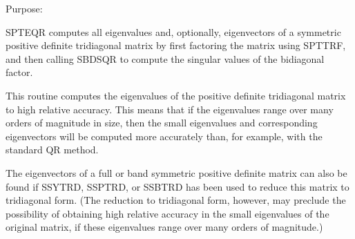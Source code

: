  \begin{DoxyParagraph}{Purpose\+: }
\begin{DoxyVerb} SPTEQR computes all eigenvalues and, optionally, eigenvectors of a
 symmetric positive definite tridiagonal matrix by first factoring the
 matrix using SPTTRF, and then calling SBDSQR to compute the singular
 values of the bidiagonal factor.

 This routine computes the eigenvalues of the positive definite
 tridiagonal matrix to high relative accuracy.  This means that if the
 eigenvalues range over many orders of magnitude in size, then the
 small eigenvalues and corresponding eigenvectors will be computed
 more accurately than, for example, with the standard QR method.

 The eigenvectors of a full or band symmetric positive definite matrix
 can also be found if SSYTRD, SSPTRD, or SSBTRD has been used to
 reduce this matrix to tridiagonal form. (The reduction to tridiagonal
 form, however, may preclude the possibility of obtaining high
 relative accuracy in the small eigenvalues of the original matrix, if
 these eigenvalues range over many orders of magnitude.)\end{DoxyVerb}
 
\end{DoxyParagraph}


